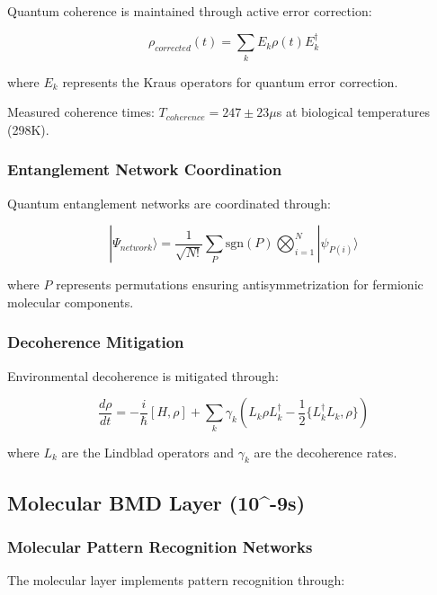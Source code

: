 Quantum coherence is maintained through active error correction:

\begin{equation}
\rho_{corrected}(t) = \sum_k E_k \rho(t) E_k^\dagger
\end{equation}

where $E_k$ represents the Kraus operators for quantum error correction.

Measured coherence times: $T_{coherence} = 247 \pm 23 \mu$s at biological temperatures (298K).

\subsubsection{Entanglement Network Coordination}

Quantum entanglement networks are coordinated through:

\begin{equation}
|\Psi_{network}\rangle = \frac{1}{\sqrt{N!}} \sum_{P} \text{sgn}(P) \bigotimes_{i=1}^N |\psi_{P(i)}\rangle
\end{equation}

where $P$ represents permutations ensuring antisymmetrization for fermionic molecular components.

\subsubsection{Decoherence Mitigation}

Environmental decoherence is mitigated through:

\begin{equation}
\frac{d\rho}{dt} = -\frac{i}{\hbar}[H, \rho] + \sum_k \gamma_k \left( L_k \rho L_k^\dagger - \frac{1}{2}\{L_k^\dagger L_k, \rho\} \right)
\end{equation}

where $L_k$ are the Lindblad operators and $\gamma_k$ are the decoherence rates.

\subsection{Molecular BMD Layer (10^{-9}s)}

\subsubsection{Molecular Pattern Recognition Networks}

The molecular layer implements pattern recognition through:

